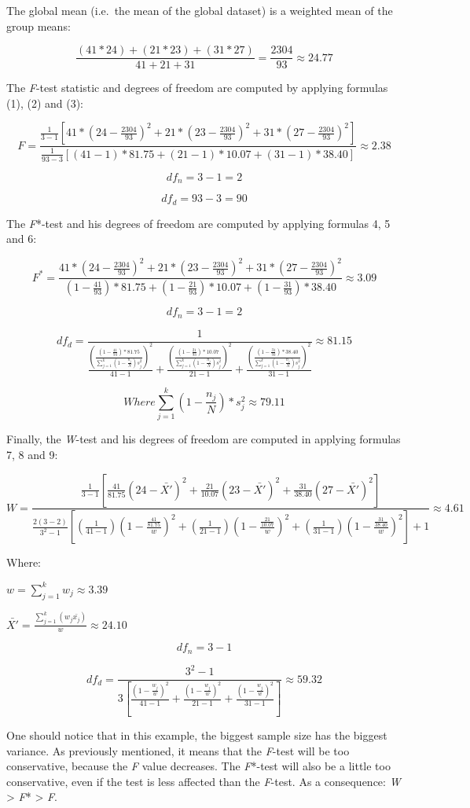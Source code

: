 \documentclass[man,floatsintext]{apa6}
\begin{document}
\begin{appendix}
The global mean (i.e.~the mean of the global dataset) is a weighted mean
of the group means:

\[\frac{(41*24)+(21*23)+(31*27)}{41+21+31}=\frac{2304}{93} \approx 24.77\]

The \emph{F}-test statistic and degrees of freedom are computed by
applying formulas (1), (2) and (3):

\[
F=\frac{\frac{1}{3-1}[41*(24-\frac{2304}{93})^2+21*(23-\frac{2304}{93})^2+31*(27-\frac{2304}{93})^2]}
{\frac{1}{93-3}[(41-1)*81.75+(21-1)*10.07+(31-1)*38.40]} \approx 2.38
\]

\[
df_n=3-1=2
\]

\[
df_d=93-3=90
\]

The \emph{F}*-test and his degrees of freedom are computed by applying
formulas 4, 5 and 6:

\[
F^*=\frac{41*(24-\frac{2304}{93})^2+21*(23-\frac{2304}{93})^2+31*(27-\frac{2304}{93})^2}{(1-\frac{41}{93})*81.75+(1-\frac{21}{93})*10.07+(1-\frac{31}{93})*38.40} \approx 3.09
\]

\[
df_n=3-1=2
\]

\[
df_d=\frac{1}{\frac{(\frac{(1-\frac{41}{93})*81.75}{\sum_{j=1}^k(1-\frac{n_j}{N})s_j^2})^2}{41-1}+\frac{(\frac{(1-\frac{21}{93})*10.07}{\sum_{j=1}^k(1-\frac{n_j}{N})s_j^2})^2}{21-1}+\frac{(\frac{(1-\frac{31}{93})*38.40}{\sum_{j=1}^k(1-\frac{n_j}{N})s_j^2})^2}{31-1}} \approx 81.15
\]

\[ Where \sum_{j=1}^k(1-\frac{n_j}{N})*s_j^2 \approx 79.11\]

Finally, the \emph{W}-test and his degrees of freedom are computed in
applying formulas 7, 8 and 9:

\[
W=\frac{\frac{1}{3-1}[\frac{41}{81.75}(24-\bar{X'})^2+\frac{21}{10.07}(23-\bar{X'})^2+\frac{31}{38.40}(27-\bar{X'})^2]}
{\frac{2(3-2)}{3^2-1}[(\frac{1}{41-1})(1-\frac{\frac{41}{81.75}}{w})^2+(\frac{1}{21-1})(1-\frac{\frac{21}{10.07}}{w})^2+(\frac{1}{31-1})(1-\frac{\frac{31}{38.40}}{w})^2]+1} \approx 4.61
\]

Where:

\(w=\sum_{j=1}^k w_j \approx 3.39\)

\(\bar{X'}=\frac{\sum_{j=1}^k (w_j\bar{x_j})}{w} \approx 24.10\)

\[
df_n=3-1
\]

\[
df_d=\frac{3^2-1}{3[\frac{(1-\frac{w_j}{w})^2}{41-1}+\frac{(1-\frac{w_j}{w})^2}{21-1}+\frac{(1-\frac{w_j}{w})^2}{31-1}]} \approx 59.32
\]

One should notice that in this example, the biggest sample size has the
biggest variance. As previously mentioned, it means that the
\emph{F}-test will be too conservative, because the \emph{F} value
decreases. The \emph{F}*-test will also be a little too conservative,
even if the test is less affected than the \emph{F}-test. As a
consequence: \emph{W} \textgreater{} \emph{F}* \textgreater{} \emph{F}.
\end{appendix}
\end{document}
